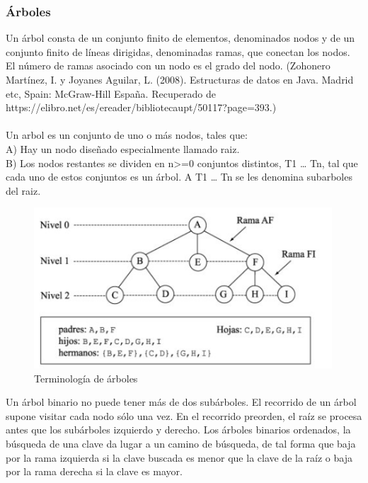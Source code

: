 \documentclass{article}
\begin{document}
\subsubsection{Árboles}
Un árbol consta de un conjunto finito de elementos, denominados nodos y de un conjunto finito de líneas dirigidas, denominadas ramas, que conectan los nodos. El número de ramas asociado con un nodo es el grado del nodo. (Zohonero Martínez, I. y Joyanes Aguilar, L. (2008). Estructuras de datos en Java. Madrid etc, Spain: McGraw-Hill España. Recuperado de https://elibro.net/es/ereader/bibliotecaupt/50117?page=393.)\\\\Un arbol es un conjunto de uno o más nodos, tales que:\\A) Hay un nodo diseñado especialmente llamado raiz.\\B) Los nodos restantes se dividen en n>=0 conjuntos distintos, T1 … Tn, tal que cada uno de estos conjuntos es un árbol. A T1 … Tn se les denomina subarboles del raiz.
\begin{figure}[ht]
    \centering     
    \includegraphics[height=6cm]{images/figura8.jpg}
    \caption{Terminología de árboles}
    \label{fig:BiasVoltager}
    
\end{figure}
Un árbol binario no puede tener más de dos subárboles. El recorrido de un árbol supone visitar cada nodo sólo una vez. En el recorrido preorden, el raíz se procesa antes que los subárboles izquierdo y derecho. Los árboles binarios ordenados, la búsqueda de una clave da lugar a un camino de búsqueda, de tal forma que baja por la rama izquierda si la clave buscada es menor que la clave de la raíz o baja por la rama derecha si la clave es mayor.
\end{document}
